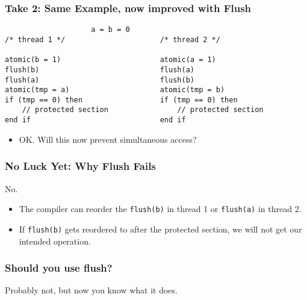 \begin{frame}[fragile]
  \frametitle{Take 2: Same Example, now improved with Flush}

  \begin{lstlisting}
                    a = b = 0
/* thread 1 */                      /* thread 2 */

atomic(b = 1)                       atomic(a = 1)
flush(b)                            flush(a)
flush(a)                            flush(b)
atomic(tmp = a)                     atomic(tmp = b)
if (tmp == 0) then                  if (tmp == 0) then
    // protected section                // protected section
end if                              end if
  \end{lstlisting}

  \begin{itemize}
    \item OK. Will this now prevent simultaneous access?
  \end{itemize}
\end{frame}

\begin{frame}[fragile]
  \frametitle{No Luck Yet: Why Flush Fails}

  

  \begin{center}
    \alert{\LARGE No.}
  \end{center}

  \begin{itemize}
    \item The compiler can reorder the {\tt flush(b)} in thread 1 or
      {\tt flush(a)} in thread 2.

    \item If {\tt flush(b)} gets reordered to after the protected
      section, we will not get our intended operation.
  \end{itemize}
  
\end{frame}

\begin{frame}[fragile]
  \frametitle{Should you use flush?}

  
  \Large
  Probably not, but now you know what it does.
  

\end{frame}


